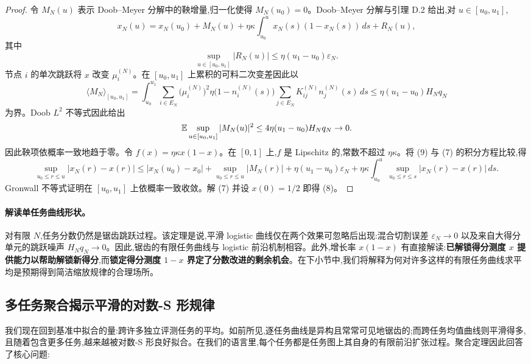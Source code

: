 \begin{proof}
令 $M_{N}(u)$ 表示 Doob--Meyer 分解中的鞅增量,归一化使得 $M_{N}(u_{0}) = 0$。Doob--Meyer 分解与引理 D.2 给出,对 $u \in [u_{0}, u_{1}]$,
\[
    x_{N}(u) = x_{N}(u_{0}) + M_{N}(u) + \eta \kappa \int_{u_{0}}^{u} x_{N}(s) (1 - x_{N}(s))\, ds + R_{N}(u), \tag{9}
\]
其中
\[
    \sup_{u \in [u_{0}, u_{1}]} |R_{N}(u)| \leq \eta (u_{1} - u_{0}) \varepsilon_{N}.
\]
节点 $i$ 的单次跳跃将 $x$ 改变 $\mu^{(N)}_{i}$。在 $[u_{0}, u_{1}]$ 上累积的可料二次变差因此以
\[
    \langle M_{N} \rangle_{[u_{0}, u_{1}]}
    = \int_{u_{0}}^{u_{1}} \sum_{i \in E_{N}} \bigl( \mu^{(N)}_{i} \bigr)^{2} \eta \bigl( 1 - n^{(N)}_{i}(s) \bigr) \sum_{j \in E_{N}} K^{(N)}_{ij} n^{(N)}_{j}(s)\, ds
    \leq \eta (u_{1} - u_{0}) H_{N} q_{N}
\]
为界。Doob $L^{2}$ 不等式因此给出
\[
    \mathbb{E} \sup_{u \in [u_{0}, u_{1}]} |M_{N}(u)|^{2} \leq 4 \eta (u_{1} - u_{0}) H_{N} q_{N} \to 0.
\]
因此鞅项依概率一致地趋于零。令 $f(x) = \eta \kappa x(1 - x)$。在 $[0, 1]$ 上,$f$ 是 Lipschitz 的,常数不超过 $\eta \kappa$。将 (9) 与 (7) 的积分方程比较,得
\[
    \sup_{u_{0} \leq r \leq u} |x_{N}(r) - x(r)|
    \leq |x_{N}(u_{0}) - x_{0}| + \sup_{u_{0} \leq r \leq u} |M_{N}(r)| + \eta (u_{1} - u_{0}) \varepsilon_{N}
    + \eta \kappa \int_{u_{0}}^{u} \sup_{u_{0} \leq r \leq s} |x_{N}(r) - x(r)|\, ds.
\]
Gronwall 不等式证明在 $[u_{0}, u_{1}]$ 上依概率一致收敛。解 (7) 并设 $x(0) = 1/2$ 即得 (8)。
\end{proof}

\paragraph{解读单任务曲线形状。} 对有限 $N$,任务分数仍然是锯齿跳跃过程。该定理是说,平滑 logistic 曲线仅在两个效果可忽略后出现:混合切割误差 $\varepsilon_{N} \to 0$ 以及来自大得分单元的跳跃噪声 $H_{N} q_{N} \to 0$。因此,锯齿的有限任务曲线与 logistic 前沿机制相容。此外,增长率 $x(1 - x)$ 有直接解读:\textbf{已解锁得分测度 $x$ 提供能力以帮助解锁新得分},而\textbf{锁定得分测度 $1 - x$ 界定了分数改进的剩余机会}。在下小节中,我们将解释为何对许多这样的有限任务曲线求平均是预期得到简洁缩放规律的合理场所。

\subsection{多任务聚合揭示平滑的对数-S 形规律}
\label{app:aggregation}

我们现在回到基准中拟合的量:跨许多独立评测任务的平均。如前所见,逐任务曲线是异构且常常可见地锯齿的;而跨任务均值曲线则平滑得多,且随着包含更多任务,越来越被对数-S 形良好拟合。在我们的语言里,每个任务都是任务图上其自身的有限前沿扩张过程。聚合定理因此回答了核心问题:

